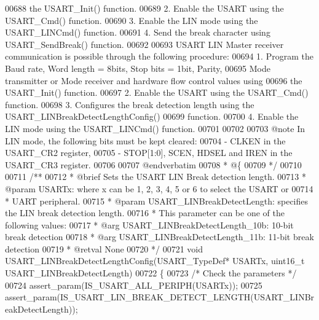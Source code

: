 \begin{DoxyCode}
00688 \textcolor{comment}{        the USART\_Init() function.}
00689 \textcolor{comment}{     2. Enable the USART using the USART\_Cmd() function.}
00690 \textcolor{comment}{     3. Enable the LIN mode using the USART\_LINCmd() function.}
00691 \textcolor{comment}{     4. Send the break character using USART\_SendBreak() function.}
00692 \textcolor{comment}{}
00693 \textcolor{comment}{  USART LIN Master receiver communication is possible through the following procedure:}
00694 \textcolor{comment}{     1. Program the Baud rate, Word length = 8bits, Stop bits = 1bit, Parity, }
00695 \textcolor{comment}{        Mode transmitter or Mode receiver and hardware flow control values using }
00696 \textcolor{comment}{        the USART\_Init() function.}
00697 \textcolor{comment}{     2. Enable the USART using the USART\_Cmd() function.}
00698 \textcolor{comment}{     3. Configures the break detection length using the USART\_LINBreakDetectLengthConfig()}
00699 \textcolor{comment}{        function.}
00700 \textcolor{comment}{     4. Enable the LIN mode using the USART\_LINCmd() function.}
00701 \textcolor{comment}{}
00702 \textcolor{comment}{}
00703 \textcolor{comment}{@note In LIN mode, the following bits must be kept cleared:}
00704 \textcolor{comment}{        - CLKEN in the USART\_CR2 register,}
00705 \textcolor{comment}{        - STOP[1:0], SCEN, HDSEL and IREN in the USART\_CR3 register.}
00706 \textcolor{comment}{}
00707 \textcolor{comment}{@endverbatim}
00708 \textcolor{comment}{  * @\{}
00709 \textcolor{comment}{  */}
00710 
00711 \textcolor{comment}{/**}
00712 \textcolor{comment}{  * @brief  Sets the USART LIN Break detection length.}
00713 \textcolor{comment}{  * @param  USARTx: where x can be 1, 2, 3, 4, 5 or 6 to select the USART or }
00714 \textcolor{comment}{  *         UART peripheral.}
00715 \textcolor{comment}{  * @param  USART\_LINBreakDetectLength: specifies the LIN break detection length.}
00716 \textcolor{comment}{  *          This parameter can be one of the following values:}
00717 \textcolor{comment}{  *            @arg USART\_LINBreakDetectLength\_10b: 10-bit break detection}
00718 \textcolor{comment}{  *            @arg USART\_LINBreakDetectLength\_11b: 11-bit break detection}
00719 \textcolor{comment}{  * @retval None}
00720 \textcolor{comment}{  */}
00721 \textcolor{keywordtype}{void} USART_LINBreakDetectLengthConfig(USART\_TypeDef* USARTx, uint16\_t USART\_LINBreakDetectLength)
00722 \{
00723   \textcolor{comment}{/* Check the parameters */}
00724   assert_param(IS\_USART\_ALL\_PERIPH(USARTx));
00725   assert_param(IS\_USART\_LIN\_BREAK\_DETECT\_LENGTH(USART\_LINBreakDetectLength));

\end{DoxyCode}
